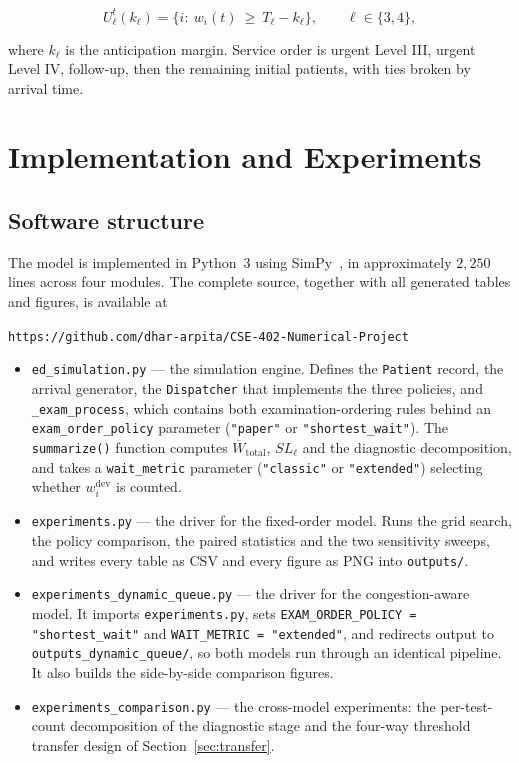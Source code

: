 \documentclass[sigconf]{acmart}
\newcommand{\Wtot}{\overline{W}_{\text{total}}}
\begin{document}
\begin{equation}
U^t_\ell(k_\ell)=\{i:\ w_i(t)\ \ge\ T_\ell-k_\ell\},\qquad \ell\in\{3,4\},
\label{eq:urgent}
\end{equation}

where $k_\ell$ is the anticipation margin. Service order is urgent Level III,
urgent Level IV, follow-up, then the remaining initial patients, with ties
broken by arrival time.


\section{Implementation and Experiments}
\label{sec:impl}

\subsection{Software structure}

The model is implemented in Python~3 using SimPy~\cite{simpy}, in approximately
$2{,}250$ lines across four modules. The complete source, together with all
generated tables and figures, is available at

\begin{center}
\texttt{https://github.com/dhar-arpita/CSE-402-Numerical-Project}
\end{center}

\begin{itemize}
\item \texttt{ed\_simulation.py} --- the simulation engine. Defines the
\texttt{Patient} record, the arrival generator, the \texttt{Dispatcher} that
implements the three policies, and \texttt{\_exam\_process}, which contains
both examination-ordering rules behind an \texttt{exam\_order\_policy}
parameter (\texttt{"paper"} or \texttt{"shortest\_wait"}). The
\texttt{summarize()} function computes $\Wtot$, $SL_\ell$ and the diagnostic
decomposition, and takes a \texttt{wait\_metric} parameter
(\texttt{"classic"} or \texttt{"extended"}) selecting whether
$w^{\mathrm{dev}}_i$ is counted.

\item \texttt{experiments.py} --- the driver for the fixed-order model. Runs
the grid search, the policy comparison, the paired statistics and the two
sensitivity sweeps, and writes every table as CSV and every figure as PNG into
\texttt{outputs/}.

\item \texttt{experiments\_dynamic\_queue.py} --- the driver for the
congestion-aware model. It imports \texttt{experiments.py}, sets
\texttt{EXAM\_ORDER\_POLICY = "shortest\_wait"} and
\texttt{WAIT\_METRIC = "extended"}, and redirects output to
\texttt{outputs\_dynamic\_queue/}, so both models run through an identical
pipeline. It also builds the side-by-side comparison figures.

\item \texttt{experiments\_comparison.py} --- the cross-model experiments: the
per-test-count decomposition of the diagnostic stage and the four-way threshold
transfer design of Section~\ref{sec:transfer}.
\end{itemize}
\end{document}
